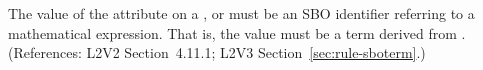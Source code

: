 The value of the  attribute on a \AlgebraicRule, \RateRule or
\AssignmentRule must be an SBO identifier referring to a mathematical
expression.  That is, the value must be a term derived from
\sbomathformula.  (References: L2V2 Section~4.11.1;
L2V3 Section~\ref{sec:rule-sboterm}.)
